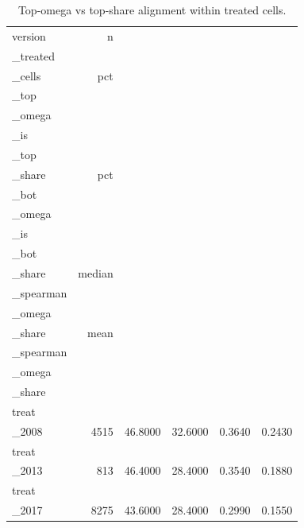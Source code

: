 \begin{table}[ht]
\centering
\caption{Top-omega vs top-share alignment within treated cells.} 
\begin{tabular}{lrrrrr}
  \toprule
version & n\\_treated\\_cells & pct\\_top\\_omega\\_is\\_top\\_share & pct\\_bot\\_omega\\_is\\_bot\\_share & median\\_spearman\\_omega\\_share & mean\\_spearman\\_omega\\_share \\ 
  \midrule
treat\\_2008 &  4515 & 46.8000 & 32.6000 & 0.3640 & 0.2430 \\ 
  treat\\_2013 &   813 & 46.4000 & 28.4000 & 0.3540 & 0.1880 \\ 
  treat\\_2017 &  8275 & 43.6000 & 28.4000 & 0.2990 & 0.1550 \\ 
   \bottomrule
\end{tabular}
\end{table}
